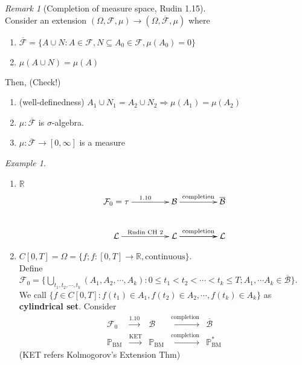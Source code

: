 \documentclass[12pt]{report}
\renewcommand{\1}{\mathbb{1}}
\renewcommand{\subset}{\subseteq}
\theoremstyle{break}
\theoremstyle{newdef}
\theoremstyle{remark}
\newtheorem*{exmp}{Example} %
\newtheorem*{rem}{Remark} %
\begin{document}
\begin{rem}[Completion of measure space, Rudin 1.15]
\leavevmode\\
Consider an extension $(\Omega, \mathcal{F}, \mu) \rightarrow (\Omega, \overline{\mathcal{F}}, \mu)$ where
\begin{enumerate}
\item $\overline{\mathcal{F}} = \{ A \cup N : A \in \mathcal{F}, N \subset A_0 \in \mathcal{F}, \mu(A_0) = 0 \}$
\item $\mu(A \cup N) = \mu(A)$
\end{enumerate}
Then, (Check!)
\begin{enumerate}
\item (well-definedness) $A_1 \cup N_1 = A_2 \cup N_2 \Rightarrow \mu(A_1) = \mu(A_2)$
\item $\mu: \overline{\mathcal{F}}$ is $\sigma$-algebra.
\item $\mu : \overline{\mathcal{F}} \rightarrow [0,\infty]$ is a measure
\end{enumerate}
\end{rem}

\begin{exmp}
\leavevmode
\begin{enumerate}[label = \arabic*)]
\item $\mathbb{R}$
$$
\xymatrix@R+0.25em@C+2em{
\ar @{} [dr] |{}
\mathcal{F}_0 = \tau \ar[r]^{1.10} & \mathcal{B} \ar[r]^{\text{completion}} & \overline{\mathcal{B}}\\
\mathcal{L} \ar[r]^{\text{Rudin CH 2}} & \mathcal{L} \ar[r]^{\text{completion}} \ar[r] & \mathcal{L}
}
$$



\item $C[0,T] = \Omega = \{f ; f : [0,T] \rightarrow \mathbb{R}, \text{continuous}\}$.\\
Define $\mathcal{F}_0 = \{\bigcup_{t_1,t_2,\cdots,t_k}(A_1,A_2,\cdots,A_k)
: 0 \leq t_1 < t_2 < \cdots < t_k \leq T; A_1, \cdots A_k \in \overline{\mathcal{B}}
\}$.
We call $\{f \in C[0,T]: f(t_1) \in A_1, f(t_2) \in A_2, \cdots, f(t_k) \in A_k\}$ as \textbf{cylindrical set}.
Consider
$$
\begin{aligned}
\mathcal{F}_0 &\overset{1.10}{\longrightarrow} &\mathcal{B} &\overset{\text{completion}}{\longrightarrow} &\overline{\mathcal{B}}\\
\mathbb{P}_{\text{BM}} &\overset{\text{KET}}{\longrightarrow} &\mathbb{P}_{\text{BM}} &\overset{\text{completion}}{\longrightarrow} &\mathbb{P}^*_{\text{BM}}
\end{aligned}
$$
(KET refers Kolmogorov's Extension Thm)
\end{enumerate}
\end{exmp}
\end{document}
